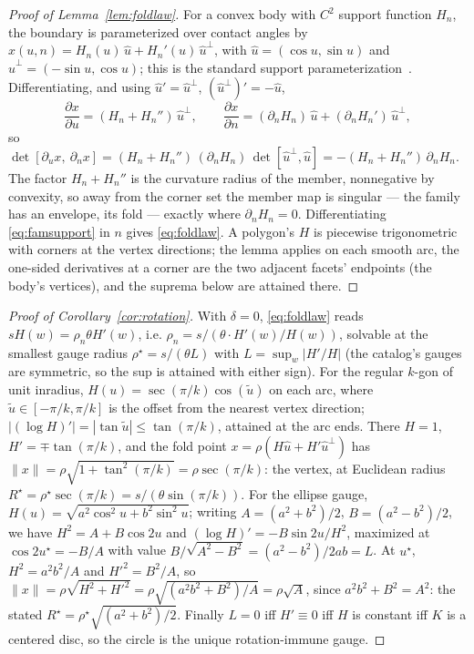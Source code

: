\begin{proof}[Proof of Lemma~\ref{lem:foldlaw}]
For a convex body with $C^2$ support function $H_n$, the boundary is
parameterized over contact angles by
$x(u,n)=H_n(u)\,\hat u+H_n'(u)\,\hat u^{\perp}$, with
$\hat u=(\cos u,\sin u)$ and $\hat u^{\perp}=(-\sin u,\cos u)$; this is the
standard support parameterization~\cite{Schneider2014Convex}. Differentiating,
and using $\hat u'=\hat u^{\perp}$, $(\hat u^{\perp})'=-\hat u$,
\begin{equation*}
  \frac{\partial x}{\partial u}=(H_n+H_n'')\,\hat u^{\perp},
  \qquad
  \frac{\partial x}{\partial n}
    =(\partial_nH_n)\,\hat u+(\partial_nH_n')\,\hat u^{\perp},
\end{equation*}
so $\det[\partial_ux,\ \partial_nx]
=(H_n+H_n'')\,(\partial_nH_n)\,\det[\hat u^{\perp},\hat u]
=-(H_n+H_n'')\,\partial_nH_n$. The factor $H_n+H_n''$ is the curvature radius
of the member, nonnegative by convexity, so away from the corner set the
member map is singular --- the family has an envelope, its fold --- exactly
where $\partial_nH_n=0$. Differentiating \eqref{eq:famsupport} in $n$ gives
\eqref{eq:foldlaw}. A polygon's $H$ is piecewise trigonometric with corners
at the vertex directions; the lemma applies on each smooth arc, the one-sided
derivatives at a corner are the two adjacent facets' endpoints (the body's
vertices), and the suprema below are attained there.
\end{proof}

\begin{proof}[Proof of Corollary~\ref{cor:rotation}]
With $\delta=0$, \eqref{eq:foldlaw} reads $sH(w)=\rho_n\theta H'(w)$, i.e.
$\rho_n=s/(\theta\cdot H'(w)/H(w))$, solvable at the smallest gauge radius
$\rho^\star=s/(\theta L)$ with $L=\sup_w|H'/H|$ (the catalog's gauges are
symmetric, so the sup is attained with either sign). For the regular $k$-gon
of unit inradius, $H(u)=\sec(\pi/k)\cos(\tilde u)$ on each arc, where
$\tilde u\in[-\pi/k,\pi/k]$ is the offset from the nearest vertex direction;
$|(\log H)'|=|\tan\tilde u|\le\tan(\pi/k)$, attained at the arc ends. There
$H=1$, $H'=\mp\tan(\pi/k)$, and the fold point
$x=\rho(H\hat u+H'\hat u^{\perp})$ has
$\lVert x\rVert=\rho\sqrt{1+\tan^2(\pi/k)}=\rho\sec(\pi/k)$: the vertex, at
Euclidean radius $R^\star=\rho^\star\sec(\pi/k)=s/(\theta\sin(\pi/k))$. For
the ellipse gauge, $H(u)=\sqrt{a^2\cos^2u+b^2\sin^2u}$; writing
$A=(a^2+b^2)/2$, $B=(a^2-b^2)/2$, we have $H^2=A+B\cos2u$ and
$(\log H)'=-B\sin2u/H^2$, maximized at $\cos2u^\star=-B/A$ with value
$B/\sqrt{A^2-B^2}=(a^2-b^2)/2ab=L$. At $u^\star$, $H^2=a^2b^2/A$ and
$H'^2=B^2/A$, so
$\lVert x\rVert=\rho\sqrt{H^2+H'^2}=\rho\sqrt{(a^2b^2+B^2)/A}=\rho\sqrt{A}$,
since $a^2b^2+B^2=A^2$: the stated $R^\star=\rho^\star\sqrt{(a^2+b^2)/2}$.
Finally $L=0$ iff $H'\equiv0$ iff $H$ is constant iff $K$ is a centered
disc, so the circle is the unique rotation-immune gauge.
\end{proof}

